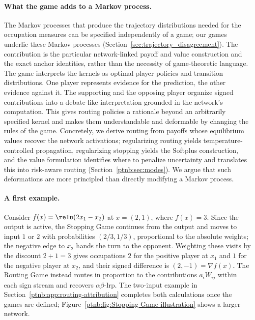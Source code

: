 \paragraph{What the game adds to a Markov process.}
The Markov processes that produce the trajectory distributions needed for the occupation measures can be specified independently of a game; our games underlie these Markov processes (Section~\ref{sec:trajectory_disagreement}). The contribution is the particular network-linked payoff and value construction and the exact anchor identities, rather than the necessity of game-theoretic language. The game interprets the kernels as optimal player policies and transition distributions. One player represents evidence for the prediction, the other evidence against it. The supporting and the opposing player organize signed contributions into a debate-like interpretation grounded in the network's computation. This gives routing policies a rationale beyond an arbitrarily specified kernel and makes them understandable and deformable by changing the rules of the game. Concretely, we derive routing from payoffs whose equilibrium values recover the network activations; regularizing routing yields temperature-controlled propagation, regularizing stopping yields the Softplus construction, and the value formulation identifies where to penalize uncertainty and translates this into risk-aware routing (Section~\ref{ptnb:sec:modes}). We argue that such deformations are more principled than directly modifying a Markov process.

\paragraph{A first example.}
Consider $f(x)=\relu(2x_1-x_2)$ at $x=(2,1)$, where $f(x)=3$. Since the output is active, the
Stopping Game continues from the output and moves to input $1$ or $2$ with probabilities
$(2/3,1/3)$, proportional to the absolute weights; the negative edge to $x_2$ hands the turn to the
opponent. Weighting these visits by the discount $2+1=3$ gives occupations $2$ for the positive
player at $x_1$ and $1$ for the negative player at $x_2$, and their signed difference is
$(2,-1)=\nabla f(x)$. The Routing Game instead routes in proportion to the contributions
$a_iW_{ij}$ within each sign stream and recovers $\alpha\beta$-\ac{lrp}. The two-input example in
Section~\ref{ptnb:app:routing-attribution} completes both calculations once the games are defined;
Figure~\ref{ptnb:fig:Stopping-Game-illustration} shows a larger network.


